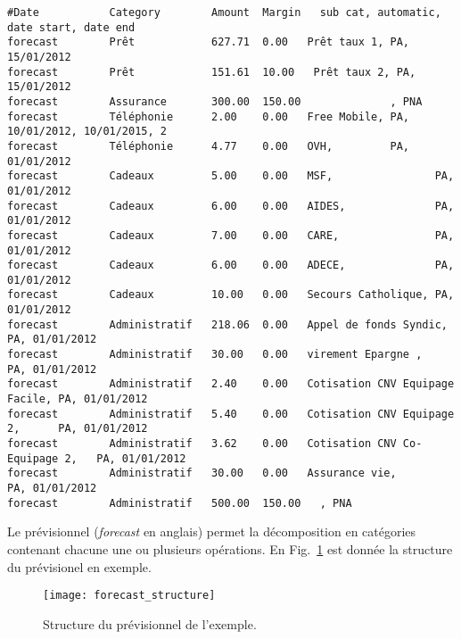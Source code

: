\linenumbers
\footnotesize
\begin{verbatim}
#Date           Category        Amount  Margin   sub cat, automatic, date start, date end
forecast        Prêt            627.71  0.00   Prêt taux 1, PA, 15/01/2012
forecast        Prêt            151.61  10.00   Prêt taux 2, PA, 15/01/2012
forecast        Assurance       300.00  150.00              , PNA
forecast        Téléphonie      2.00    0.00   Free Mobile, PA, 10/01/2012, 10/01/2015, 2
forecast        Téléphonie      4.77    0.00   OVH,         PA, 01/01/2012
forecast        Cadeaux         5.00    0.00   MSF,                PA, 01/01/2012
forecast        Cadeaux         6.00    0.00   AIDES,              PA, 01/01/2012
forecast        Cadeaux         7.00    0.00   CARE,               PA, 01/01/2012
forecast        Cadeaux         6.00    0.00   ADECE,              PA, 01/01/2012
forecast        Cadeaux         10.00   0.00   Secours Catholique, PA, 01/01/2012
forecast        Administratif   218.06  0.00   Appel de fonds Syndic,          PA, 01/01/2012
forecast        Administratif   30.00   0.00   virement Epargne ,              PA, 01/01/2012
forecast        Administratif   2.40    0.00   Cotisation CNV Equipage Facile, PA, 01/01/2012
forecast        Administratif   5.40    0.00   Cotisation CNV Equipage 2,      PA, 01/01/2012
forecast        Administratif   3.62    0.00   Cotisation CNV Co-Equipage 2,   PA, 01/01/2012
forecast        Administratif   30.00   0.00   Assurance vie,                  PA, 01/01/2012
forecast        Administratif   500.00  150.00   , PNA
\end{verbatim}
\nolinenumbers
\normalsize

Le prévisionnel (\textit{forecast} en anglais) permet la décomposition en catégories contenant
chacune une ou plusieurs opérations. En Fig.~\ref{forecast:example} est donnée la structure
du prévisionel en exemple.

\begin{figure}
\centering
\texttt{[image: forecast\_structure]}
\caption{\label{forecast:example}Structure du prévisionnel de l'exemple.}
\end{figure}
